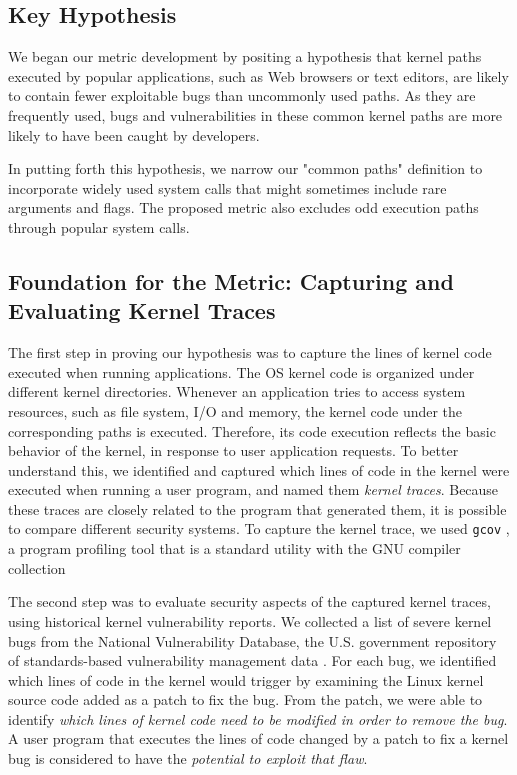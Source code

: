 


\subsection{Key Hypothesis}

We began our metric development by positing a hypothesis
that kernel paths executed by popular applications, such as Web browsers or
text editors, are likely to contain fewer exploitable bugs than uncommonly used paths.
As they are frequently used, bugs and vulnerabilities in these common kernel
paths are more likely to have been caught by developers.

In putting forth this hypothesis, we narrow our "common paths" definition
to incorporate widely used system calls that might sometimes include rare arguments
and flags. The proposed metric also excludes odd execution paths through popular
system calls.

\subsection{Foundation for the Metric: Capturing and Evaluating Kernel Traces}

The first step in proving our hypothesis was to capture the lines of kernel
code executed when running applications. The OS kernel code
is organized under different kernel directories.
Whenever an application tries to access system resources, such as file
system, I/O and memory, the kernel code under the corresponding paths is executed. Therefore,
its code execution reflects the basic behavior of the kernel, in response
to user application requests. To better understand this, we identified and
captured which lines of code in the kernel
were executed when running a user program, and named them  \textit{kernel traces}.
Because these traces are closely related to the program that generated them, it is
possible to compare different security systems.
To capture the kernel trace, we used \texttt{gcov} \cite{gcov}, a program profiling
tool that is a standard utility with the GNU compiler collection

The second step was to evaluate security aspects of the captured kernel traces,%
using historical kernel vulnerability reports. We collected a list of
severe kernel bugs from the National Vulnerability Database, the U.S. government repository of
standards-based vulnerability management data \cite{NVD}. For each bug, we
identified which lines of code
in the kernel would trigger by examining the Linux kernel source code
added as a patch to fix the bug. From the patch,
we were able to identify \textit{which lines of kernel code need to be modified in order to
remove the bug}.
A user program that executes the lines of code changed by a patch to fix a
kernel bug is considered to have the \textit{potential to exploit that flaw}.


